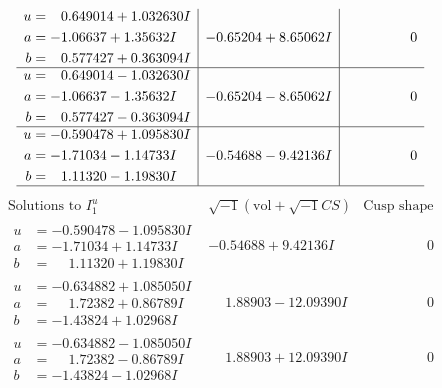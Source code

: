 \documentclass[1p]{elsarticle_modified}
\theoremstyle{definition}
\newcommand{\I}{\sqrt{-1}}
\begin{document}
$$\begin{array}{c|c|c}
\begin{aligned}
u &= \phantom{-}0.649014 + 1.032630 I \\
a &= -1.06637 + 1.35632 I \\
b &= \phantom{-}0.577427 + 0.363094 I\end{aligned}
 & -0.65204 + 8.65062 I & \phantom{-0.000000 } 0 \\ \hline\begin{aligned}
u &= \phantom{-}0.649014 - 1.032630 I \\
a &= -1.06637 - 1.35632 I \\
b &= \phantom{-}0.577427 - 0.363094 I\end{aligned}
 & -0.65204 - 8.65062 I & \phantom{-0.000000 } 0 \\ \hline\begin{aligned}
u &= -0.590478 + 1.095830 I \\
a &= -1.71034 - 1.14733 I \\
b &= \phantom{-}1.11320 - 1.19830 I\end{aligned}
 & -0.54688 - 9.42136 I & \phantom{-0.000000 } 0\\
 \hline 
 \end{array}$$\newpage$$\begin{array}{c|c|c}  
\text{Solutions to }I^u_{1}& \I (\text{vol} + \sqrt{-1}CS) & \text{Cusp shape}\\
 \hline 
\begin{aligned}
u &= -0.590478 - 1.095830 I \\
a &= -1.71034 + 1.14733 I \\
b &= \phantom{-}1.11320 + 1.19830 I\end{aligned}
 & -0.54688 + 9.42136 I & \phantom{-0.000000 } 0 \\ \hline\begin{aligned}
u &= -0.634882 + 1.085050 I \\
a &= \phantom{-}1.72382 + 0.86789 I \\
b &= -1.43824 + 1.02968 I\end{aligned}
 & \phantom{-}1.88903 - 12.09390 I & \phantom{-0.000000 } 0 \\ \hline\begin{aligned}
u &= -0.634882 - 1.085050 I \\
a &= \phantom{-}1.72382 - 0.86789 I \\
b &= -1.43824 - 1.02968 I\end{aligned}
 & \phantom{-}1.88903 + 12.09390 I & \phantom{-0.000000 } 0 \\ \hline\begin{aligned}

\end{aligned}
\end{array}$$
\end{document}
